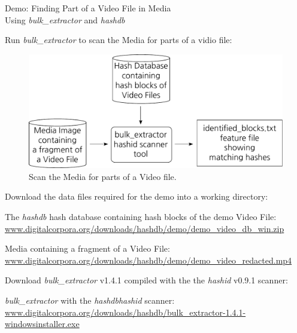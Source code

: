 \documentclass[12pt,twoside]{article}
\newcommand{\hdb}{\emph{hashdb}\xspace}
\newcommand{\bulk}{\emph{bulk\_extractor}\xspace}
\newcommand{\hashid}{\emph{hashid}\xspace}
\begin{document}
\begin{center}
\Large Demo: Finding Part of a Video File in Media \\
\large Using \bulk and \hdb
\end{center}

Run \bulk to scan the Media for parts of a vidio file:

\begin{figure}[H]
  \center
  \includegraphics[scale=0.6]{drawings/scan_hashid}
  \caption*{Scan the Media for parts of a Video file.}
  \label{fig:scan_hashid}
\end{figure}

Download the data files required for the demo into a working directory:
\begin{compactitem}
\item The \hdb hash database containing hash blocks of the demo Video File:
\url{www.digitalcorpora.org/downloads/hashdb/demo/demo\_video\_db\_win.zip}
\item Media containing a fragment of a Video File:
\url{www.digitalcorpora.org/downloads/hashdb/demo/demo\_video\_redacted.mp4}
\end{compactitem}
Download \bulk v1.4.1 compiled with the the \hashid v0.9.1 scanner:
\begin{compactitem}
\item \bulk with the \hdb \hashid scanner:
\url{www.digitalcorpora.org/downloads/hashdb/bulk\_extractor-1.4.1-windowsinstaller.exe}
\end{compactitem}
\end{document}
